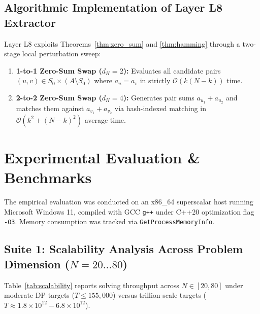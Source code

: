 \documentclass[journal,onecolumn,11pt]{IEEEtran}
\begin{document}
\subsection{Algorithmic Implementation of Layer L8 Extractor}
Layer L8 exploits Theorems~\ref{thm:zero_sum} and \ref{thm:hamming} through a two-stage local perturbation sweep:
\begin{enumerate}
    \item \textbf{1-to-1 Zero-Sum Swap ($d_H = 2$):} Evaluates all candidate pairs $(u, v) \in S_0 \times (A \setminus S_0)$ where $a_u = a_v$ in strictly $\mathcal{O}(k(N-k))$ time.
    \item \textbf{2-to-2 Zero-Sum Swap ($d_H = 4$):} Generates pair sums $a_{u_1} + a_{u_2}$ and matches them against $a_{v_1} + a_{v_2}$ via hash-indexed matching in $\mathcal{O}(k^2 + (N-k)^2)$ average time.
\end{enumerate}

\section{Experimental Evaluation \& Benchmarks}
\label{sec:experiments}

The empirical evaluation was conducted on an x86\_64 superscalar host running Microsoft Windows 11, compiled with GCC \texttt{g++} under C++20 optimization flag \texttt{-O3}. Memory consumption was tracked via \texttt{GetProcessMemoryInfo}.

\subsection{Suite 1: Scalability Analysis Across Problem Dimension ($N = 20 \dots 80$)}
Table~\ref{tab:scalability} reports solving throughput across $N \in [20, 80]$ under moderate DP targets ($T \le 155{,}000$) versus trillion-scale targets ($T \approx 1.8 \times 10^{12} - 6.8 \times 10^{12}$).
\end{document}
